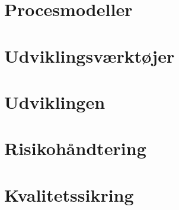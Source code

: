 \chapter{Procesmodeller}\label{ch:procesmodeller}




\chapter{Udviklingsværktøjer}\label{ch:udviklingsvaerktoejer}



\chapter{Udviklingen}\label{ch:Brug af Scrum og XP}





\chapter{Risikohåndtering}\label{ch:risikohaandtering}


\chapter{Kvalitetssikring}\label{ch:kvalitetssikring}




